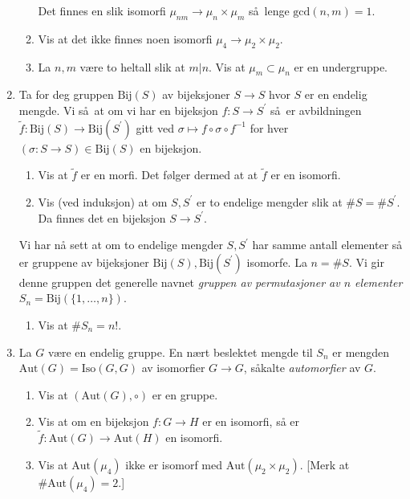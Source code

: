 \begin{enumerate}[resume]
\begin{enumerate}
                Det finnes en slik isomorfi $\mu_{nm}\to \mu_n\times \mu_m$
                så lenge $\mathrm{gcd}(n,m) = 1$.
            \item Vis at det ikke finnes noen isomorfi $\mu_4\to \mu_2\times\mu_2$.
            \item La $n, m$ være to heltall slik at $m | n$.
                Vis at $\mu_m\subset \mu_n$ er en undergruppe.
        \end{enumerate}
    \item Ta for deg gruppen $\mathrm{Bij}(S)$ av bijeksjoner $S\to S$
        hvor $S$ er en endelig mengde.
        Vi så at om vi har en bijeksjon $f\colon S\to S^\prime$
        så er avbildningen
        $\tilde f\colon \mathrm{Bij}(S)\to \mathrm{Bij}(S^\prime)$
        gitt ved $\sigma\mapsto f\circ \sigma \circ f^{-1}$
        for hver $(\sigma\colon S\to S)\in\mathrm{Bij}(S)$
        en bijeksjon.
        \begin{enumerate}
            \item Vis at $\tilde f$ er en morfi.
                Det følger dermed at at $\tilde f$ er en isomorfi.
            \item Vis (ved induksjon) at om $S, S^\prime$ er to endelige mengder
                slik at $\# S = \# S^\prime$.
                Da finnes det en bijeksjon $S\to S^\prime$.
        \end{enumerate}
        Vi har nå sett at om to endelige mengder $S, S^\prime$
        har samme antall elementer så er gruppene av bijeksjoner
        $\mathrm{Bij}(S), \mathrm{Bij}(S^\prime)$ isomorfe.
        La $n = \# S$.
        Vi gir denne gruppen det generelle navnet
        \textit{gruppen av permutasjoner av $n$ elementer}
        $S_n = \mathrm{Bij}(\{1,\dots,n\})$.
        \begin{enumerate}[resume]
            \item Vis at $\# S_n = n!$.
        \end{enumerate}
    \item La $G$ være en endelig gruppe.
        En nært beslektet mengde til $S_n$ er mengden
        $\mathrm{Aut}(G) = \mathrm{Iso}(G, G)$
        av isomorfier $G\to G$, såkalte \textit{automorfier} av $G$.
        \begin{enumerate}
            \item Vis at $(\mathrm{Aut}(G), \circ)$ er en gruppe.
            \item Vis at om en bijeksjon $f\colon G\to H$ er en isomorfi,
                så er $\tilde f\colon \mathrm{Aut}(G)\to \mathrm{Aut}(H)$
                en isomorfi.
            \item Vis at $\mathrm{Aut}(\mu_4)$ ikke er isomorf
                med $\mathrm{Aut}(\mu_2\times\mu_2)$.
                [Merk at $\#\mathrm{Aut}(\mu_4) = 2$.]
        \end{enumerate}
\end{enumerate}

